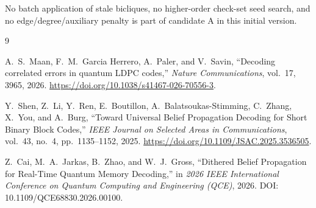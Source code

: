 \documentclass[11pt,a4paper]{article}
\begin{document}
No batch application of stale bicliques, no higher-order check-set seed search,
and no edge/degree/auxiliary penalty is part of candidate A in this initial
version.

\begin{thebibliography}{9}

A.~S.~Maan, F.~M.~Garcia Herrero, A.~Paler, and V.~Savin,
``Decoding correlated errors in quantum LDPC codes,''
\emph{Nature Communications}, vol.~17, 3965, 2026.
\url{https://doi.org/10.1038/s41467-026-70556-3}.

Y.~Shen, Z.~Li, Y.~Ren, E.~Boutillon, A.~Balatsoukas-Stimming,
C.~Zhang, X.~You, and A.~Burg,
``Toward Universal Belief Propagation Decoding for Short Binary Block Codes,''
\emph{IEEE Journal on Selected Areas in Communications},
vol.~43, no.~4, pp.~1135--1152, 2025.
\url{https://doi.org/10.1109/JSAC.2025.3536505}.

Z.~Cai, M.~A.~Jarkas, B.~Zhao, and W.~J.~Gross,
``Dithered Belief Propagation for Real-Time Quantum Memory Decoding,''
in \emph{2026 IEEE International Conference on Quantum Computing and
Engineering (QCE)}, 2026.
DOI: 10.1109/QCE68830.2026.00100.

\end{thebibliography}
\end{document}
